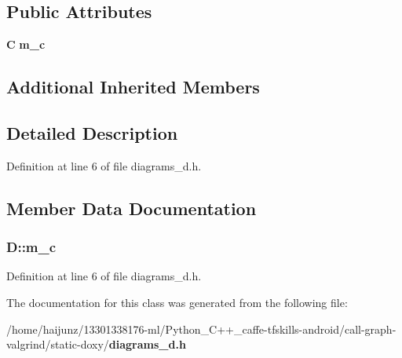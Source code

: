 \subsection*{Public Attributes}
\begin{DoxyCompactItemize}
\item 
{\bf C} {\bf m\-\_\-c}
\end{DoxyCompactItemize}
\subsection*{Additional Inherited Members}


\subsection{Detailed Description}


Definition at line 6 of file diagrams\-\_\-d.\-h.



\subsection{Member Data Documentation}
\subsubsection[{m\-\_\-c}]{ D\-::m\-\_\-c}\label{class_d_a9d877c7aa092f423f2a073f3c62fef9c}


Definition at line 6 of file diagrams\-\_\-d.\-h.



The documentation for this class was generated from the following file\-:\begin{DoxyCompactItemize}
\item 
/home/haijunz/13301338176-\/ml/\-Python\-\_\-\-C++\-\_\-caffe-\/tfskills-\/android/call-\/graph-\/valgrind/static-\/doxy/{\bf diagrams\-\_\-d.\-h}\end{DoxyCompactItemize}
